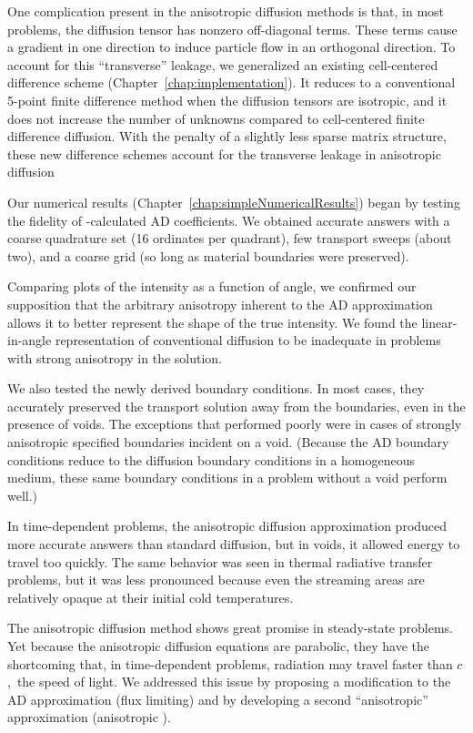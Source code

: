 One complication present in the anisotropic diffusion methods is
that, in most problems, the diffusion tensor has nonzero off-diagonal terms.
These terms cause a gradient in one direction to induce particle flow in an
orthogonal direction. To account for this ``transverse'' leakage, we generalized
an existing cell-centered difference scheme (Chapter~\ref{chap:implementation}).
It reduces to a conventional 5-point finite difference method when the diffusion
tensors are isotropic, and it does not increase the number of unknowns compared
to cell-centered finite difference diffusion. With the penalty of a slightly
less sparse matrix structure, these new difference schemes account for the
transverse leakage in anisotropic diffusion

Our numerical results (Chapter~\ref{chap:simpleNumericalResults}) began by
testing the fidelity of \SN-calculated AD coefficients. We obtained accurate
answers with a coarse quadrature set (16 ordinates per quadrant), few
transport sweeps (about two), and a coarse grid (so long as material boundaries
were preserved).

Comparing plots of the intensity as a function of angle, we confirmed our
supposition that the arbitrary anisotropy inherent to the AD approximation
allows it to better represent the shape of the true intensity. We found
the linear-in-angle representation of conventional diffusion to be inadequate
in problems with strong anisotropy in the solution.

We also tested the newly derived boundary conditions. In most cases, they
accurately preserved the transport solution away from the boundaries, even in
the presence of voids. The exceptions that performed poorly were in cases of
strongly anisotropic specified boundaries incident on a void. (Because the AD
boundary
conditions reduce to the diffusion boundary conditions in a homogeneous medium,
these same boundary conditions in a problem without a void perform well.)

In time-dependent problems, the anisotropic diffusion approximation produced
more accurate answers than standard diffusion, but in voids, it allowed energy
to travel too quickly. The same behavior was seen in thermal radiative transfer
problems, but it was less pronounced because even the streaming areas are
relatively opaque at their initial cold temperatures.

The anisotropic diffusion method shows great promise in steady-state problems.
Yet because the anisotropic diffusion equations are parabolic, they have the
shortcoming that, in time-dependent problems, radiation may travel faster than
$c$,~the speed of light. We addressed this issue by proposing a modification to
the AD approximation (flux limiting) and by developing a second ``anisotropic''
approximation (anisotropic \Pone).

